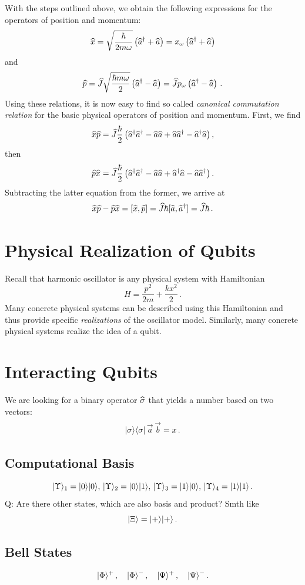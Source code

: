 With the steps outlined above, we obtain the following expressions for the operators of position and momentum:
\[
\widehat{x}=\sqrt{\frac{\hbar}{2m\omega}}\left(\widehat{a}^\dagger+\widehat{a}\right)=x_\omega\left(\widehat{a}^\dagger+\widehat{a}\right)
\]
and
\[
\widehat{p}=\widehat{J}\sqrt{\frac{\hbar m\omega}{2}}\left(\widehat{a}^\dagger-\widehat{a}\right)=\widehat{J} p_\omega\left(\widehat{a}^\dagger-\widehat{a}\right)\,.
\]
Using these relations, it is now easy to find so called \emph{canonical commutation relation} for the basic physical operators of position and momentum. First, we find
\[
\widehat{x}\widehat{p}=\widehat{J}\frac{\hbar}{2}\left(\widehat{a}^\dagger\widehat{a}^\dagger-\widehat{a}\widehat{a}+\widehat{a}\widehat{a}^\dagger-\widehat{a}^\dagger\widehat{a}\right),
\]
then
\[
\widehat{p}\widehat{x}=\widehat{J}\frac{\hbar}{2}\left(\widehat{a}^\dagger\widehat{a}^\dagger-\widehat{a}\widehat{a}+\widehat{a}^\dagger\widehat{a}-\widehat{a}\widehat{a}^\dagger\right).
\]
Subtracting the latter equation from the former, we arrive at
\[
\widehat{x}\widehat{p}-\widehat{p}\widehat{x}=\lbrack \widehat{x},\widehat{p}\rbrack=\widehat{J}\hbar\lbrack \widehat{a},\widehat{a}^\dagger\rbrack=\widehat{J}\hbar\,.
\]

\section{Physical Realization of Qubits}
Recall that harmonic oscillator is any physical system with Hamiltonian
\[
H = \frac{p^2}{2m}+\frac{kx^2}{2}\,.
\] 
Many concrete physical systems can be described using this Hamiltonian and thus provide specific \emph{realizations} of 
the oscillator model. Similarly, many concrete physical systems realize the idea of a qubit.

\section{Interacting Qubits}\label{sec:InteractingQubits}
We are looking for a binary operator $\widehat{\sigma}$ that yields a number
based on two vectors:
\[
|{\sigma}\rangle\langle{\sigma}|\,\overset{\rightarrow}{a}\,\overset{\rightarrow}{b}=x\,.
\]
\subsection{Computational Basis}
\[
|{\Upsilon}\rangle_1 = |{0}\rangle|{0}\rangle,\,|{\Upsilon}\rangle_2 = |{0}\rangle|{1}\rangle,\,
|{\Upsilon}\rangle_3 = |{1}\rangle|{0}\rangle,\,|{\Upsilon}\rangle_4 = |{1}\rangle|{1}\rangle\,.
\]
Q: Are there other states, which are also basis and product? Smth like
\[
|{\Xi}\rangle=|{+}\rangle|{+}\rangle\,.
\]

\subsection{Bell States}
\[
|{\Phi}\rangle^{+}\,,\quad|{\Phi}\rangle^{-}\,,\quad
|{\Psi}\rangle^{+}\,,\quad|{\Psi}\rangle^{-}\,.
\]


